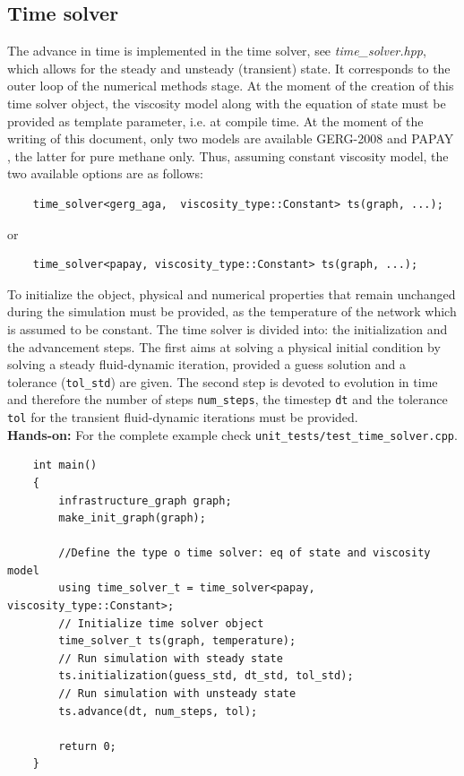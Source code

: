 \subsection{Time solver} \label{sec:time_solver}
The advance in time is implemented in the time solver, see \textit{time\_solver.hpp}, which allows for the steady and unsteady (transient) state. It corresponds to the outer loop of the numerical methods stage.
At the moment of the creation of this time solver object, the viscosity model along with the equation of state  must be provided as template parameter, i.e. at compile time. At the moment of the writing of this document, only two models are available GERG-2008 and PAPAY  \cite{Papay1968}, the latter for pure methane only. Thus, assuming constant viscosity model, the two available options are as follows:
\begin{verbatim}
    time_solver<gerg_aga,  viscosity_type::Constant> ts(graph, ...);   
\end{verbatim}
or
\begin{verbatim}
    time_solver<papay, viscosity_type::Constant> ts(graph, ...);   
\end{verbatim}

To initialize the object, physical and numerical properties that remain unchanged during the simulation must be provided, as  the temperature of the network which is assumed to be constant. The time solver is divided into: the initialization and the advancement steps. The first aims at solving a physical initial condition by solving a steady fluid-dynamic iteration, provided a guess solution and a tolerance (\texttt{tol\_std}) are given. The second step is devoted to evolution in time and therefore the number of steps \texttt{num\_steps}, the timestep \texttt{dt} and the tolerance \texttt{tol} for the transient fluid-dynamic iterations must be provided.\\

\textbf{Hands-on:}
For the complete example check \texttt{unit\_tests/test\_time\_solver.cpp}.    
\begin{verbatim}
    int main()
    {
        infrastructure_graph graph;
        make_init_graph(graph);

        //Define the type o time solver: eq of state and viscosity model
        using time_solver_t = time_solver<papay, viscosity_type::Constant>; 
        // Initialize time solver object
        time_solver_t ts(graph, temperature);
        // Run simulation with steady state
        ts.initialization(guess_std, dt_std, tol_std); 
        // Run simulation with unsteady state
        ts.advance(dt, num_steps, tol);
     
        return 0;
    }
\end{verbatim}
    

